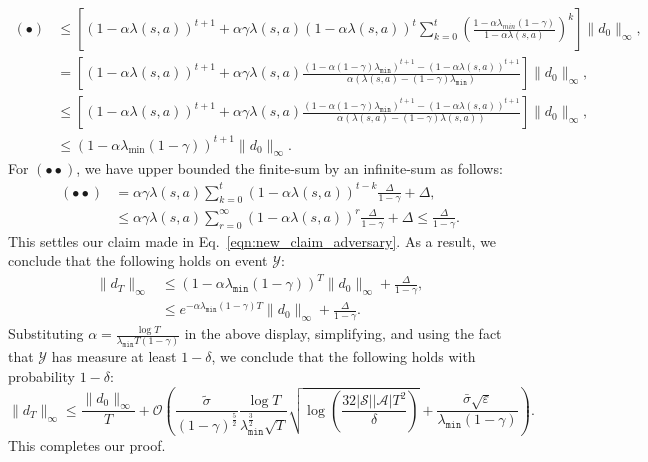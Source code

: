 \documentclass{article}
\newcommand{\mc}{\mathcal}
\begin{document}
\begin{equation}\label{eqn:noiseless-pre-final-bound}
\begin{aligned}
(\bullet) & \leq \left[ (1 - \alpha \lambda(s,a))^{t+1} + \alpha \gamma \lambda(s,a) (1 - \alpha\lambda(s,a))^t\sum_{k=0}^{t} \left(\frac{1 - \alpha  \lambda_{min} (1-\gamma)}{1 - \alpha\lambda(s,a)}\right)^k \right] \|d_0\|_\infty,\\
& \overset{}{=} \left[ (1 - \alpha \lambda(s,a))^{t+1} + \alpha \gamma \lambda(s,a) \frac{(1 - \alpha(1-\gamma)\lambda_{\texttt{min}})^{t+1}-(1 - \alpha\lambda(s,a))^{t+1}}{\alpha\left( \lambda(s,a) - (1-\gamma)\lambda_{\texttt{min}}\right)} \right] \|d_0\|_\infty, \\
& \overset{}{\le} \left[ (1 - \alpha \lambda(s,a))^{t+1} + \alpha \gamma \lambda(s,a) \frac{(1 - \alpha(1-\gamma)\lambda_{\texttt{min}})^{t+1}-(1 - \alpha\lambda(s,a))^{t+1}}{\alpha\left( \lambda(s,a) - (1-\gamma)\lambda(s,a)\right)} \right] \|d_0\|_\infty, \\
& \le \left(1 - \alpha \lambda_{\min}(1 - \gamma) \right)^{t+1} \|d_0\|_\infty.
\end{aligned}
\end{equation}
For \((\bullet \bullet)\), we have upper bounded the finite-sum by an infinite-sum as follows:
\begin{equation}
    \begin{aligned}
       (\bullet \bullet) &= \alpha\gamma\lambda(s,a)\sum_{k=0}^{t} (1 - \alpha \lambda(s,a))^{t-k} \frac{\Delta}{1-\gamma}+ \Delta, \\
       & \le \alpha\gamma\lambda(s,a)\sum_{r=0}^{\infty} (1 - \alpha \lambda(s,a))^{r} \frac{\Delta}{1-\gamma}+ \Delta \le \frac{\Delta}{1-\gamma}.
    \end{aligned}
\end{equation}
This settles our claim made in Eq.~\eqref{eqn:new_claim_adversary}. As a result, we conclude that the following holds on event $\mc{Y}$: 
\begin{equation}\label{eqn:new_final_noiseless_bound_for general_alpha_adversary}
\begin{aligned}
    \lVert d_{T} \rVert_{\infty} &\leq (1 - \alpha \lambda_{\texttt{min}}(1-\gamma))^{T} \lVert d_0 \rVert_{\infty}+ \frac{\Delta}{1-\gamma}, \\
    & \leq e^{-\alpha \lambda_{\texttt{min}}(1-\gamma)T} \lVert d_0 \rVert_{\infty}+ \frac{\Delta}{1-\gamma}.
    \end{aligned}
\end{equation}
Substituting \( \alpha = \frac{\log T}{\lambda_{\texttt{min}}T(1-\gamma)} \) in the above display, simplifying, and using the fact that $\mc{Y}$ has measure at least $1-\delta$, we conclude that the following holds with probability $1-\delta$: 
\begin{equation}
    \lVert d_T \rVert_{\infty} \leq \frac{\lVert d_0 \rVert_{\infty}}{T} + \mc{O}\left( \frac{\tilde{\sigma}}{(1-\gamma)^{\frac{5}{2}}}  \frac{\log T}{\lambda_{\texttt{min}}^{\frac{3}{2}}\sqrt{T}} \sqrt{ \log \left(\frac{32 |\mathcal{S}||\mathcal{A}| T^2}{\delta}\right)} +  \frac{\bar{\sigma}\sqrt{\varepsilon}}{\lambda_{\texttt{min}}(1-\gamma)}\right). 
\end{equation}
This completes our proof.
\end{document}
